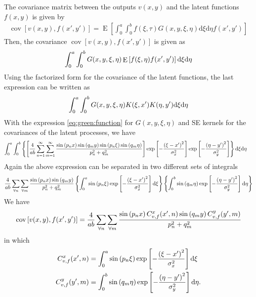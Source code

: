 \documentclass[a4paper,10pt]{article}
\newcommand{\dif}{\textrm{d}}
\DeclareMathOperator{\cov}{cov} \DeclareMathOperator{\ex}{E}
\begin{document}
The covariance matrix between the outputs $v(x,y)$ and the latent
functions  $f(x,y)$
is given by
\begin{align}
\cov\left[v(x,y),f(x',y')\right]=\ex\left[\int_0^a\int_0^bf(\xi,\tau)G(x, y, \xi, \eta)\dif\xi\dif\eta f(x',y')\right]
\end{align}
Then, the covariance $\cov\left[v(x,y),f(x',y')\right]$ is given
as
\begin{align}\notag
\int_0^a\int_0^bG(x,y, \xi,\eta)\ex\left[f(\xi,\eta)f(x',y')\right]
\dif\xi\dif\eta
\end{align}
Using the factorized form for the covariance of the latent functions, the last expression can be written as
\begin{align}\notag
\int_0^a\int_0^bG(x,y, \xi,\eta)K(\xi,x')K(\eta,y')\dif\xi\dif\eta
\end{align}
With the expression \eqref{eq:green:function} for $G(x, y, \xi,\eta)$ and SE kernels for the
covariances of the latent processes, we have
\begin{align}\notag
\begin{split}
\int_0^a\int_0^b&\left\{\left[
\frac{4}{ab}\sum_{n=1}^\infty
                  \sum_{m=1}^\infty\frac{\sin\left({p_n x}\right)
\sin\left(q_m y\right)\sin\left(p_n \xi\right)\sin\left(q_m \eta\right)}{p_n^2 + q_m^2}\right]
\exp\left[-\frac{\left(\xi-x'\right)^2}{\sigma^2_x}\right]\exp\left[-\frac{\left(\eta-y'\right)^2}{\sigma^2_y}\right]\right\}\dif\xi\dif\eta
\end{split}
\end{align}
Again the above expression can be separated in
two different sets of integrals
\begin{align}\notag
\frac{4}{ab} \sum_{\forall n}\sum_{\forall m} \frac{\sin\left({p_n x}\right)
\sin\left(q_m y\right)}{p_n^2 + q_m^2}
\left\{\int_0^a\sin\left(p_n\xi\right)
\exp\left[-\frac{\left(\xi-x'\right)^2}{\sigma^2_x}\right]\dif\xi\right\}
\left\{\int_0^b\sin\left(q_m\eta\right)
\exp\left[-\frac{\left(\eta-y'\right)^2}{\sigma^2_y}\right]\dif\eta\right\}
\end{align}
We have
\begin{align}\notag
\cov\left[v(x,y),f(x',y')\right]=\frac{4}{ab}
\sum_{\forall n}\sum_{\forall m} \frac{\sin\left({p_n x}\right) C^x_{v,f}(x',n)
\sin\left(q_m y\right) C^y_{v,f}(y',m)}{p_n^2 + q_m^2}
\end{align}
in which
\begin{align}\notag
C^x_{v,f}(x',n) &= \int_0^a\sin\left(p_n\xi\right)
\exp\left[-\frac{\left(\xi-x'\right)^2}{\sigma^2_x}\right]\dif\xi\\\notag
C^y_{v,f}(y',m) &= \int_0^b\sin\left(q_m\eta\right)
\exp\left[-\frac{\left(\eta-y'\right)^2}{\sigma^2_y}\right]\dif\eta.
\end{align}
\end{document}
